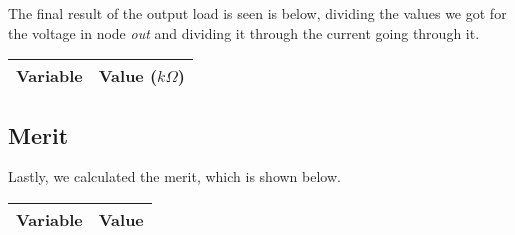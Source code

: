 \vspace{0.4cm}

The final result of the output load is seen is below, dividing the values we got for the voltage in node \textit{out} and dividing it through the current going through it.

\vspace{0.4cm}

\begin{center}
\begin{tabular}{|l|r|}
  \hline    
  {\bf Variable} & {\bf Value ($k\Omega$)} \\ \hline
  
\end{tabular}
\end{center}

\vspace{0.4cm}



\subsection{Merit}

Lastly, we calculated the merit, which is shown below.

\vspace{0.4cm}

\begin{center}
\begin{tabular}{|l|r|}
  \hline    
  {\bf Variable} & {\bf Value} \\ \hline
  
\end{tabular}
\end{center}